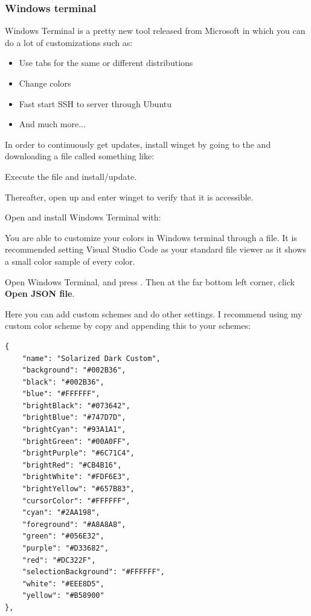 \subsubsection{Windows terminal}

Windows Terminal is a pretty new tool released from Microsoft in which you can do a lot of customizations such as:

\begin{itemize}
    \item Use tabs for the same or different distributions
    \item Change colors
    \item Fast start SSH to server through Ubuntu
    \item And much more...
\end{itemize}


In order to continuously get updates, install winget by going to the  and downloading a file called something like:


Execute the file and install/update.

Thereafter, open up  and enter winget to verify that it is accessible.

Open  and install Windows Terminal with:



You are able to customize your colors in Windows terminal through a  file. It is recommended setting Visual Studio Code as your standard  file viewer as it shows a small color sample of every  color.

Open Windows Terminal, and press . Then at the far bottom left corner, click \textbf{Open JSON file}.

Here you can add custom schemes and do other settings. I recommend using my custom color scheme by copy and appending this to your schemes:

\begin{verbatim}
{
    "name": "Solarized Dark Custom",
    "background": "#002B36",
    "black": "#002B36",
    "blue": "#FFFFFF",
    "brightBlack": "#073642",
    "brightBlue": "#747D7D",
    "brightCyan": "#93A1A1",
    "brightGreen": "#00A0FF",
    "brightPurple": "#6C71C4",
    "brightRed": "#CB4B16",
    "brightWhite": "#FDF6E3",
    "brightYellow": "#657B83",
    "cursorColor": "#FFFFFF",
    "cyan": "#2AA198",
    "foreground": "#A8A8A8",
    "green": "#056E32",
    "purple": "#D33682",
    "red": "#DC322F",
    "selectionBackground": "#FFFFFF",
    "white": "#EEE8D5",
    "yellow": "#B58900" 
},
\end{verbatim}

